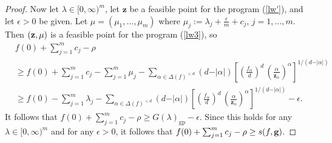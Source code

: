 \documentclass[10pt,a4paper]{amsart}
\begin{document}
\begin{proof}
Now let $\lambda \in [0,\infty)^m$, let $\mathbf{z}$ be a feasible point for the program (\ref{lw'}), and let $\epsilon>0$ be given.
Let $\mu = (\mu_1,\dots,\mu_m)$ where $\mu_j:= \lambda_j+\frac{\epsilon}{m}+c_j$, $j=1,\dots,m$.
Then $({\bf z}, \mu)$ is a feasible point for the program (\ref{lw3}), so
%
\begin{align*}
	& f(0)+\sum_{j=1}^m c_j -\rho \\ & \ge f(0)+\sum_{j=1}^m c_j- \sum_{j=1}^m \mu_j  -  \sum\limits_{\alpha\in\Delta(f)^{<d}}(d-\vert\alpha\vert)\left[
	 \left(\frac{f_\alpha}{d}\right)^{d}\,\left(\frac{\alpha}{\mathbf{z}_\alpha}\right)^\alpha
	\right]^{1/(d-\vert\alpha\vert)} \\
	 & \ge f(0)-  \sum_{j=1}^m \lambda_j-\sum\limits_{\alpha\in\Delta(f)^{<d}}(d-\vert\alpha\vert)\left[
	 \left(\frac{f_\alpha}{d}\right)^{d}\,\left(\frac{\alpha}{\mathbf{z}_\alpha}\right)^\alpha
	\right]^{1/(d-\vert\alpha\vert)} - \epsilon.
\end{align*}
%
It follows that $f(0)+\sum_{j=1}^m c_j -\rho \ge  G(\lambda)_{\operatorname{gp}}-\epsilon$. Since this holds for any $\lambda \in [0,\infty)^m$ and for any $\epsilon>0$, it follows that $f(0)+\sum_{j=1}^m c_j -\rho \ge s(f, {\bf g})$.
\end{proof}
\end{document}
